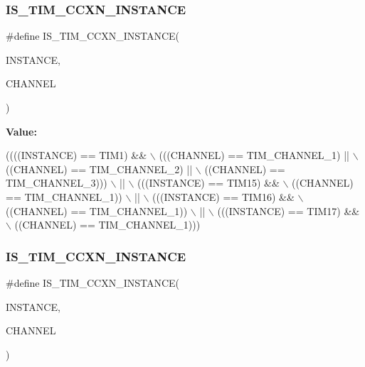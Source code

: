 \subsubsection{\texorpdfstring{I\+S\+\_\+\+T\+I\+M\+\_\+\+C\+C\+X\+N\+\_\+\+I\+N\+S\+T\+A\+N\+CE}{IS\_TIM\_CCXN\_INSTANCE}\hspace{0.1cm}{\footnotesize\ttfamily [13/16]}}
{\footnotesize\ttfamily \#define I\+S\+\_\+\+T\+I\+M\+\_\+\+C\+C\+X\+N\+\_\+\+I\+N\+S\+T\+A\+N\+CE(\begin{DoxyParamCaption}\item[{}]{I\+N\+S\+T\+A\+N\+CE,  }\item[{}]{C\+H\+A\+N\+N\+EL }\end{DoxyParamCaption})}

{\bfseries Value\+:}
\begin{DoxyCode}
((((INSTANCE) == TIM1) &&                    \(\backslash\)
     (((CHANNEL) == TIM\_CHANNEL\_1) ||           \(\backslash\)
      ((CHANNEL) == TIM\_CHANNEL\_2) ||           \(\backslash\)
      ((CHANNEL) == TIM\_CHANNEL\_3)))            \(\backslash\)
    ||                                          \(\backslash\)
    (((INSTANCE) == TIM15) &&                   \(\backslash\)
      ((CHANNEL) == TIM\_CHANNEL\_1))             \(\backslash\)
    ||                                          \(\backslash\)
    (((INSTANCE) == TIM16) &&                   \(\backslash\)
     ((CHANNEL) == TIM\_CHANNEL\_1))              \(\backslash\)
    ||                                          \(\backslash\)
    (((INSTANCE) == TIM17) &&                   \(\backslash\)
     ((CHANNEL) == TIM\_CHANNEL\_1)))
\end{DoxyCode}
\mbox{\label{group___exported__macro_ga7181cfd1649c4e65e24b7c863e94a54f}} 
\subsubsection{\texorpdfstring{I\+S\+\_\+\+T\+I\+M\+\_\+\+C\+C\+X\+N\+\_\+\+I\+N\+S\+T\+A\+N\+CE}{IS\_TIM\_CCXN\_INSTANCE}\hspace{0.1cm}{\footnotesize\ttfamily [14/16]}}
{\footnotesize\ttfamily \#define I\+S\+\_\+\+T\+I\+M\+\_\+\+C\+C\+X\+N\+\_\+\+I\+N\+S\+T\+A\+N\+CE(\begin{DoxyParamCaption}\item[{}]{I\+N\+S\+T\+A\+N\+CE,  }\item[{}]{C\+H\+A\+N\+N\+EL }\end{DoxyParamCaption})}

